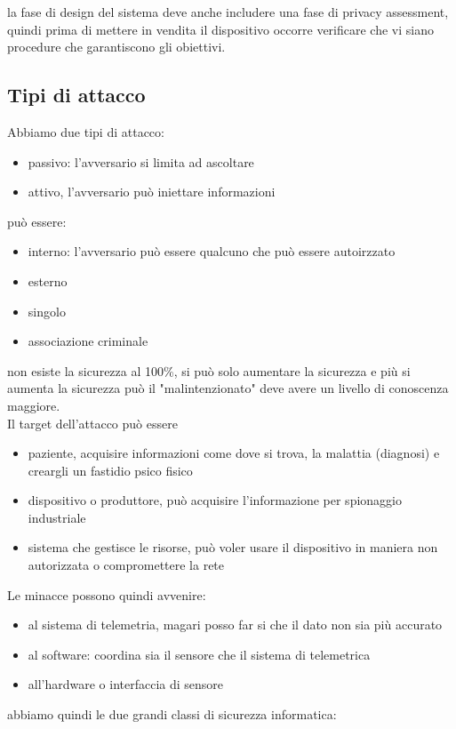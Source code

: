 \documentclass[oneside, 12pt]{extbook}
\begin{document}
la fase di design del sistema deve anche includere una fase di privacy assessment, quindi prima di mettere in vendita il dispositivo occorre verificare che vi siano procedure che garantiscono gli obiettivi.

\subsection{Tipi di attacco}
Abbiamo due tipi di attacco:
\begin{itemize}
	\item passivo: l'avversario si limita ad ascoltare
	\item attivo, l'avversario può iniettare informazioni
\end{itemize}
può essere:
\begin{itemize}
	\item interno: l'avversario può essere qualcuno che può essere autoirzzato
	\item esterno
\end{itemize}
\begin{itemize}
	\item singolo
	\item associazione criminale
\end{itemize}
non esiste la sicurezza al 100\%, si può solo aumentare la sicurezza e più si aumenta la sicurezza può il "malintenzionato" deve avere un livello di conoscenza maggiore.\\Il target dell'attacco può essere
\begin{itemize}
	\item paziente, acquisire informazioni come dove si trova, la malattia (diagnosi) e creargli un fastidio psico fisico
	\item dispositivo o produttore, può acquisire l'informazione per spionaggio industriale
	\item sistema che gestisce le risorse, può voler usare il dispositivo in maniera non autorizzata o compromettere la rete
\end{itemize}
Le minacce possono quindi avvenire:
\begin{itemize}
	\item al sistema di telemetria, magari posso far si che il dato non sia più accurato
	\item al software: coordina sia il sensore che il sistema di telemetrica
	\item all'hardware o interfaccia di sensore
\end{itemize}
abbiamo quindi le due grandi classi di sicurezza informatica:
\end{document}
